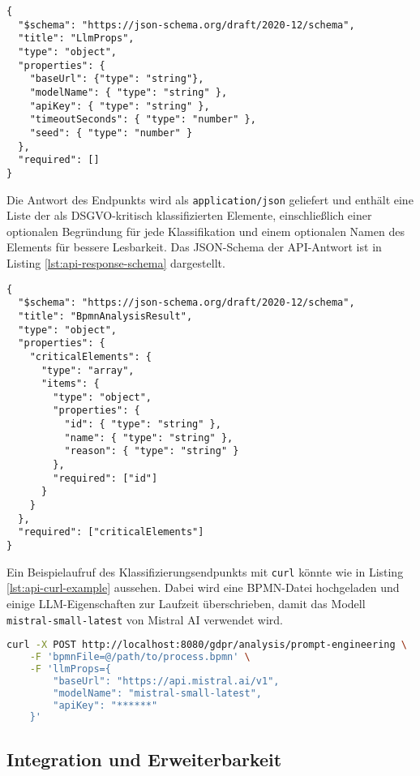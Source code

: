 \begin{lstlisting}[caption={JSON-Schema der \texttt{llmProps}.},label={lst:api-request-schema}]
{
  "$schema": "https://json-schema.org/draft/2020-12/schema",
  "title": "LlmProps",
  "type": "object",
  "properties": {
    "baseUrl": {"type": "string"},
    "modelName": { "type": "string" },
    "apiKey": { "type": "string" },
    "timeoutSeconds": { "type": "number" },
    "seed": { "type": "number" }
  },
  "required": []
}
\end{lstlisting}

Die Antwort des Endpunkts wird als \texttt{application/json} geliefert und enthält eine Liste der als \ac{DSGVO}-kritisch klassifizierten Elemente, einschließlich einer optionalen Begründung für jede Klassifikation und einem optionalen Namen des Elements für bessere Lesbarkeit. Das JSON-Schema der API-Antwort ist in Listing \ref{lst:api-response-schema} dargestellt.

\begin{lstlisting}[caption={JSON-Schema der API-Antwort.},label={lst:api-response-schema}]
{
  "$schema": "https://json-schema.org/draft/2020-12/schema",
  "title": "BpmnAnalysisResult",
  "type": "object",
  "properties": {
    "criticalElements": {
      "type": "array",
      "items": {
        "type": "object",
        "properties": {
          "id": { "type": "string" },
          "name": { "type": "string" },
          "reason": { "type": "string" }
        },
        "required": ["id"]
      }
    }
  },
  "required": ["criticalElements"]
}
\end{lstlisting}

Ein Beispielaufruf des Klassifizierungsendpunkts mit \texttt{curl} könnte wie in Listing \ref{lst:api-curl-example} aussehen. Dabei wird eine BPMN-Datei hochgeladen und einige \ac{LLM}-Eigenschaften zur Laufzeit überschrieben, damit das Modell \texttt{mistral-small-latest} von Mistral AI verwendet wird.

\begin{lstlisting}[language=bash,caption={Beispielaufruf des Klassifizierungsendpunkts mit \texttt{curl}.},label={lst:api-curl-example}]
curl -X POST http://localhost:8080/gdpr/analysis/prompt-engineering \
    -F 'bpmnFile=@/path/to/process.bpmn' \
    -F 'llmProps={
        "baseUrl": "https://api.mistral.ai/v1",
        "modelName": "mistral-small-latest",
        "apiKey": "******"
    }'
\end{lstlisting}

\subsection*{Integration und Erweiterbarkeit}

